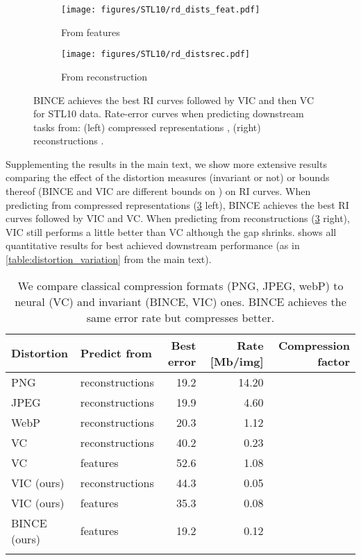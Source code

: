 \documentclass[final]{article}
\begin{document}
\begin{figure}[h]
     \centering
     \begin{subfigure}[h]{0.45\columnwidth}
         \centering
         \texttt{[image: figures/STL10/rd\_dists\_feat.pdf]}
         \caption{From features }
         \label{fig:STL10_dist_Z}
     \end{subfigure}
     \hfill{}
     \begin{subfigure}[h]{0.49\columnwidth}
         \centering
         \texttt{[image: figures/STL10/rd\_distsrec.pdf]}
         \caption{From reconstruction }
         \label{fig:STL10_dist_X}
     \end{subfigure}
\caption{
BINCE achieves the best RI curves followed by VIC and then VC for STL10 data.
Rate-error curves when predicting downstream tasks from: (left) compressed representations , (right) reconstructions .
}
\label{fig:STL10_dist}
\end{figure} 
Supplementing the results in the main text, we show more extensive results comparing the effect of the distortion measures (invariant or not) or bounds thereof (BINCE and VIC are different bounds on ) on RI curves.
When predicting from compressed representations   (\cref{fig:STL10_dist} left), BINCE achieves the best RI curves followed by VIC and VC.
When predicting from reconstructions  (\cref{fig:STL10_dist} right), VIC still performs a little better than VC although the gap shrinks.
 shows all quantitative results for best achieved downstream performance (as in \cref{table:distortion_variation} from the main text).

\begin{table}[ht]
\caption{
We compare classical compression formats (PNG, JPEG, webP) to neural (VC) and invariant (BINCE, VIC) ones. 
BINCE achieves the same error rate but compresses  better.
}
\center
\small
\begin{tabular}{llrrr}
\toprule
Distortion  & Predict from & Best error   & Rate [Mb/img] & Compression factor\\ 
\midrule 
PNG \cite{graphics_png_isoiec_2003}    &  reconstructions   &  19.2 & 14.20 &  \\
JPEG  \cite{group_jpeg_itu-t_1992} &  reconstructions   &  19.9 &  4.60 &  \\
WebP   \cite{webp_google_2018}&  reconstructions   &  20.3 &   1.12 &  \\
VC     &  reconstructions   &  40.2 &   0.23 &  \\
VC     &  features          &  52.6 &   1.08 &  \\
\midrule 
VIC (ours)   &  reconstructions  &  44.3 &   0.05 &  \\
VIC  (ours)  &  features 	     &  35.3 &   0.08 &  \\
BINCE (ours) &  features         &  19.2 &   0.12 &  \\	
\bottomrule
\label{table:distortion_variation_long}
\end{tabular}
\end{table}
\end{document}
